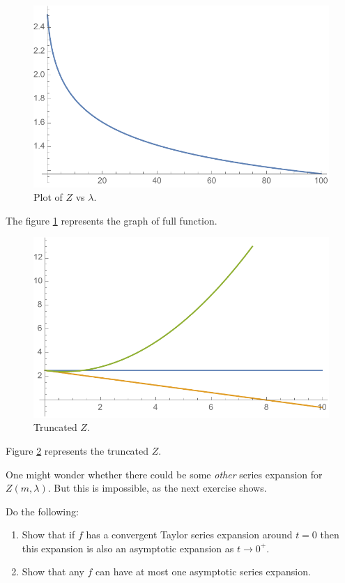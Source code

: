 \documentclass[12pt,letterpaper,reqno]{article}
\numberwithin{equation}{section}
\newcommand{\ti}[1]{\textit{#1}}
\begin{document}
\begin{solution}
  \begin{figure}
    \label{partifun}
    \centering
    \includegraphics[scale=.8]{figures/partifun.pdf}
    \caption{Plot of $Z$ vs $\lambda$.}
  \end{figure}
The figure \ref{partifun} represents the graph of full function.
\begin{figure}
  \centering
  \label{partifun1}
  \includegraphics[scale=.8]{figures/partifun1.pdf}
  \caption{Truncated $Z$.}
\end{figure}
Figure \ref{partifun1} represents the truncated $Z$.
\end{solution}

One might wonder whether there could be some \ti{other} series expansion for $Z(m,\lambda)$.
But this is impossible, as the next exercise shows.

\begin{exercise} Do the following:
\begin{enumerate}
\item Show that if $f$ has a convergent Taylor series expansion around $t = 0$ then this expansion
is also an asymptotic expansion as $t \to 0^+$.
\item Show that any $f$ can have at most one asymptotic series expansion.
\end{enumerate}
\end{exercise}
\end{document}

